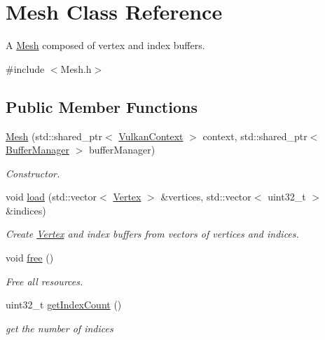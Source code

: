 \hypertarget{class_mesh}{}\section{Mesh Class Reference}
\label{class_mesh}


A \mbox{\hyperlink{class_mesh}{Mesh}} composed of vertex and index buffers.  




{\ttfamily \#include $<$Mesh.\+h$>$}

\subsection*{Public Member Functions}
\begin{DoxyCompactItemize}
\item 
\mbox{\hyperlink{class_mesh_a3d6d629589f4450a0d865175313ca589}{Mesh}} (std\+::shared\+\_\+ptr$<$ \mbox{\hyperlink{class_vulkan_context}{Vulkan\+Context}} $>$ context, std\+::shared\+\_\+ptr$<$ \mbox{\hyperlink{class_buffer_manager}{Buffer\+Manager}} $>$ buffer\+Manager)
\begin{DoxyCompactList}\small\item\em Constructor. \end{DoxyCompactList}\item 
void \mbox{\hyperlink{class_mesh_a5cfd919c6ee3b1533fa977a671e9d8ef}{load}} (std\+::vector$<$ \mbox{\hyperlink{struct_vertex}{Vertex}} $>$ \&vertices, std\+::vector$<$ uint32\+\_\+t $>$ \&indices)
\begin{DoxyCompactList}\small\item\em Create \mbox{\hyperlink{struct_vertex}{Vertex}} and index buffers from vectors of vertices and indices. \end{DoxyCompactList}\item 
\mbox{\label{class_mesh_afc4fe8ab99f33cf95466de45f24b06dc}} 
void \mbox{\hyperlink{class_mesh_afc4fe8ab99f33cf95466de45f24b06dc}{free}} ()
\begin{DoxyCompactList}\small\item\em Free all resources. \end{DoxyCompactList}\item 
uint32\+\_\+t \mbox{\hyperlink{class_mesh_a6dde20eaf4e25eba5cd13918e269445a}{get\+Index\+Count}} ()
\begin{DoxyCompactList}\small\item\em get the number of indices \end{DoxyCompactList}\item 

\end{DoxyCompactItemize}
